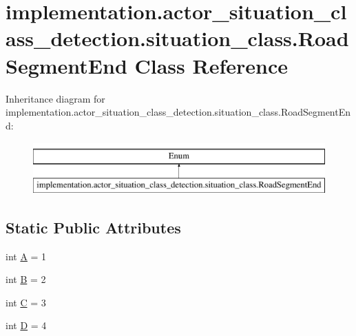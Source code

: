 \hypertarget{classimplementation_1_1actor__situation__class__detection_1_1situation__class_1_1_road_segment_end}{}\section{implementation.\+actor\+\_\+situation\+\_\+class\+\_\+detection.\+situation\+\_\+class.\+Road\+Segment\+End Class Reference}
\label{classimplementation_1_1actor__situation__class__detection_1_1situation__class_1_1_road_segment_end}
Inheritance diagram for implementation.\+actor\+\_\+situation\+\_\+class\+\_\+detection.\+situation\+\_\+class.\+Road\+Segment\+End\+:\begin{figure}[H]
\begin{center}
\leavevmode
\includegraphics[height=2.000000cm]{classimplementation_1_1actor__situation__class__detection_1_1situation__class_1_1_road_segment_end}
\end{center}
\end{figure}
\subsection*{Static Public Attributes}
\begin{DoxyCompactItemize}
\item 
int \hyperlink{classimplementation_1_1actor__situation__class__detection_1_1situation__class_1_1_road_segment_end_ac236f9ded423a3602b291070ee83c136}{A} = 1
\item 
int \hyperlink{classimplementation_1_1actor__situation__class__detection_1_1situation__class_1_1_road_segment_end_a002ab16ab927773e8aaa6d43868fcd91}{B} = 2
\item 
int \hyperlink{classimplementation_1_1actor__situation__class__detection_1_1situation__class_1_1_road_segment_end_abd9de9ed200ca5cfc4405c83547ca27e}{C} = 3
\item 
int \hyperlink{classimplementation_1_1actor__situation__class__detection_1_1situation__class_1_1_road_segment_end_a87990f0449b67dd6e539d74717f54c58}{D} = 4
\end{DoxyCompactItemize}


